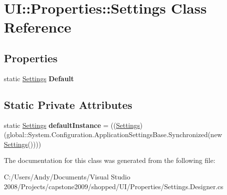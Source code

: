 \hypertarget{class_u_i_1_1_properties_1_1_settings}{
\section{UI::Properties::Settings Class Reference}
\label{class_u_i_1_1_properties_1_1_settings}
}
\subsection*{Properties}
\begin{DoxyCompactItemize}
\item 
\hypertarget{class_u_i_1_1_properties_1_1_settings_a15a0e6993e5dd68352a2c6f989ad5943}{
static \hyperlink{class_u_i_1_1_properties_1_1_settings}{Settings} {\bfseries Default}}
\label{class_u_i_1_1_properties_1_1_settings_a15a0e6993e5dd68352a2c6f989ad5943}

\end{DoxyCompactItemize}
\subsection*{Static Private Attributes}
\begin{DoxyCompactItemize}
\item 
\hypertarget{class_u_i_1_1_properties_1_1_settings_a654aafd84668bf6efdca665b4534ec55}{
static \hyperlink{class_u_i_1_1_properties_1_1_settings}{Settings} {\bfseries defaultInstance} = ((\hyperlink{class_u_i_1_1_properties_1_1_settings}{Settings})(global::System.Configuration.ApplicationSettingsBase.Synchronized(new \hyperlink{class_u_i_1_1_properties_1_1_settings}{Settings}())))}
\label{class_u_i_1_1_properties_1_1_settings_a654aafd84668bf6efdca665b4534ec55}

\end{DoxyCompactItemize}


The documentation for this class was generated from the following file:\begin{DoxyCompactItemize}
\item 
C:/Users/Andy/Documents/Visual Studio 2008/Projects/capstone2009/shopped/UI/Properties/Settings.Designer.cs\end{DoxyCompactItemize}
